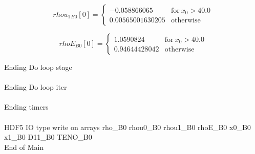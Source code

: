 \documentclass{article}
\begin{document}
\begin{dmath}{rhou_{1}{_{B0}}}[{0}] = \begin{cases} -0.058866065 & \text{for}\: x_{0} > 40.0 \\0.00565001630205 & \text{otherwise} \end{cases}\end{dmath}

\begin{dmath}{rhoE{_{B0}}}[{0}] = \begin{cases} 1.0590824 & \text{for}\: x_{0} > 40.0 \\0.94644428042 & \text{otherwise} \end{cases}\end{dmath}

\noindent Ending Do loop stage\\
\\\noindent Ending Do loop iter\\
\\\noindent Ending timers\\
\\\noindent HDF5 IO type write on arrays rho_B0 rhou0_B0 rhou1_B0 rhoE_B0 x0_B0 x1_B0 D11_B0 TENO_B0\\\noindent End of Main\\
\end{document}
